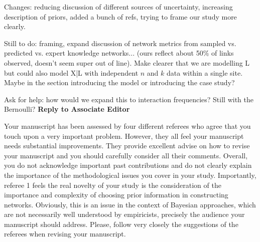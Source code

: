 \documentclass[12pt]{letter}
\newenvironment{refquote}{\bigskip \begin{it}}{\end{it}\smallskip}
\begin{document}
\newpage

\setcounter{page}{1}


Changes: reducing discussion of different sources of uncertainty, increasing description of priors, added a bunch of refs, trying to frame our study more clearly.

Still to do: framing, expand discussion of network metrics from sampled vs. predicted vs. expert knowledge networks... (ours reflect about 50\% of links observed, doesn't seem super out of line). Make clearer that we are modelling L but could also model X|L with independent $n$ and $k$ data within a single site. Maybe in the section introducing the model or introducing the case study?

Ask for help: how would we expand this to interaction frequencies? Still with the Bernoulli?
{\Large \bf Reply to Associate Editor}


	\begin{refquote}
	Your manuscript has been assessed by four different referees who agree that you touch upon a very important problem. However, they all feel your manuscript needs substantial improvements. They provide excellent advise on how to revise your manuscript and you should carefully consider all their comments. Overall, you do not acknowledge important past contributions and do not clearly explain the importance of the methodological issues you cover in your study. Importantly, referee 1 feels the real novelty of your study is the consideration of the importance and complexity of choosing prior information in constructing networks. Obviously, this is an issue in the context of Bayesian approaches, which are not necessarily well understood by empiricists, precisely the audience your manuscript should address. Please, follow very closely the suggestions of the referees when revising your manuscript.

	\end{refquote}
\end{document}
